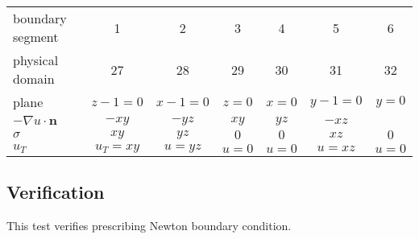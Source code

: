 \begin{center}
  \begin{tabular}{|l|c|c|c|c|c|c|}
      \hline
      boundary segment & 1 & 2 & 3 & 4 & 5 & 6 \\ 
      physical domain & 27 & 28 & 29 & 30 & 31 & 32 \\ 
      plane & $z-1=0$  & $x-1=0$ & $z=0$ & $x=0$ & $y-1=0$& $y=0$\\
      $-\nabla{}u\cdot{}\mathbf{n}$ & $-xy$ & $-yz$ & $xy$ & $yz$ & $-xz$ &\\
      $\sigma$ & $xy$ & $yz$ & $0$ & $0$ & $xz$ & $0$\\
      $u_T$ & $u_T=xy$ & $u=yz$ & $u=0$ & $u=0$ & $u=xz$ & $u=0$\\
      \hline
  \end{tabular}
\end{center}

\subsection*{Verification}
This test verifies prescribing Newton boundary condition.
